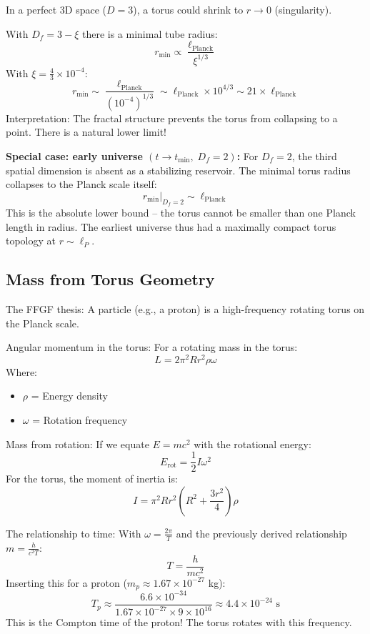In a perfect 3D space (\( D = 3 \)), a torus could shrink to \( r \to 0 \) (singularity).

With \( D_f = 3 - \xi \) there is a minimal tube radius:
\[
r_{\text{min}} \propto \frac{\ell_{\text{Planck}}}{\xi^{1/3}}
\]
With \( \xi = \frac{4}{3} \times 10^{-4} \):
\[
r_{\text{min}} \sim \frac{\ell_{\text{Planck}}}{(10^{-4})^{1/3}} \sim \ell_{\text{Planck}} \times 10^{4/3} \sim 21 \times \ell_{\text{Planck}}
\]
Interpretation: The fractal structure prevents the torus from collapsing to a point. There is a natural lower limit!

\textbf{Special case: early universe \((t \to t_{\min},\; D_f = 2)\):}
For $D_f = 2$, the third spatial dimension is absent as a stabilizing reservoir. The minimal torus radius collapses to the Planck scale itself:
\[
r_{\text{min}}\big|_{D_f=2} \sim \ell_{\text{Planck}}
\]
This is the absolute lower bound -- the torus cannot be smaller than one Planck length in radius. The earliest universe thus had a maximally compact torus topology at $r \sim \ell_P$.

\subsection{Mass from Torus Geometry}
The FFGF thesis: A particle (e.g., a proton) is a high-frequency rotating torus on the Planck scale.

Angular momentum in the torus:
For a rotating mass in the torus:
\[
L = 2\pi^2 R r^2 \rho \omega
\]
Where:
\begin{itemize}
	\item \( \rho \) = Energy density
	\item \( \omega \) = Rotation frequency
\end{itemize}

Mass from rotation:
If we equate \( E = mc^2 \) with the rotational energy:
\[
E_{\text{rot}} = \frac{1}{2} I \omega^2
\]
For the torus, the moment of inertia is:
\[
I = \pi^2 R r^2 \left(R^2 + \frac{3r^2}{4}\right) \rho
\]

The relationship to time:
With \( \omega = \frac{2\pi}{T} \) and the previously derived relationship \( m = \frac{h}{c^2 T} \):
\[
T = \frac{h}{mc^2}
\]
Inserting this for a proton (\( m_p \approx 1.67 \times 10^{-27} \) kg):
\[
T_p \approx \frac{6.6 \times 10^{-34}}{1.67 \times 10^{-27} \times 9 \times 10^{16}} \approx 4.4 \times 10^{-24} \text{ s}
\]
This is the Compton time of the proton! The torus rotates with this frequency.

